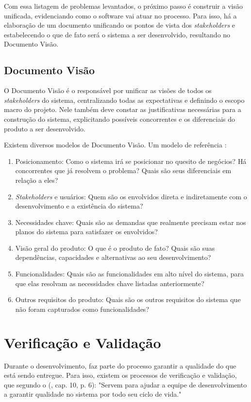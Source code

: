 Com essa listagem de problemas levantados, o próximo passo é construir a visão unificada, evidenciando como o software vai atuar no processo. Para isso, há a elaboração de um documento unificando os pontos de vista dos \textit{stakeholders} e estabelecendo o que de fato será o sistema a ser desenvolvido, resultando no Documento Visão.

\subsection{Documento Visão}
O Documento Visão é o responsável por unificar as visões de todos os \textit{stakeholders} do sistema, centralizando todas as expectativas e definindo o escopo macro do projeto. Nele também deve constar as justificativas necessárias para a construção do sistema, explicitando possíveis concorrentes e os diferenciais do produto a ser desenvolvido.

Existem diversos modelos de Documento Visão. Um modelo de referência \cite{kurtbittnerianspence2002}:

\begin{enumerate}
    \item Posicionamento: Como o sistema irá se posicionar no quesito de negócios? Há concorrentes que já resolvem o problema? Quais são seus diferenciais em relação a eles?
    \item \textit{Stakeholders} e usuários: Quem são os envolvidos direta e indiretamente com o desenvolvimento e a existência do sistema?
    \item Necessidades chave: Quais são as demandas que realmente precisam estar nos planos do sistema para satisfazer os envolvidos?
    \item Visão geral do produto: O que é o produto de fato? Quais são suas dependências, capacidades e alternativas ao seu desenvolvimento?
    \item Funcionalidades: Quais são as funcionalidades em alto nível do sistema, para que elas resolvam as necessidades chave listadas anteriormente?
    \item Outros requisitos do produto: Quais são os outros requisitos do sistema que não foram capturados como funcionalidades?
\end{enumerate}

\section{Verificação e Validação}
Durante o desenvolvimento, faz parte do processo garantir a qualidade do que está sendo entregue. Para isso, existem os processos de verificação e validação, que segundo o \citeauthor{ieeecomputersociety2014} (\citeyear{ieeecomputersociety2014}, cap. 10, p. 6): "Servem para ajudar a equipe de desenvolvimento a garantir qualidade no sistema por todo seu ciclo de vida."


